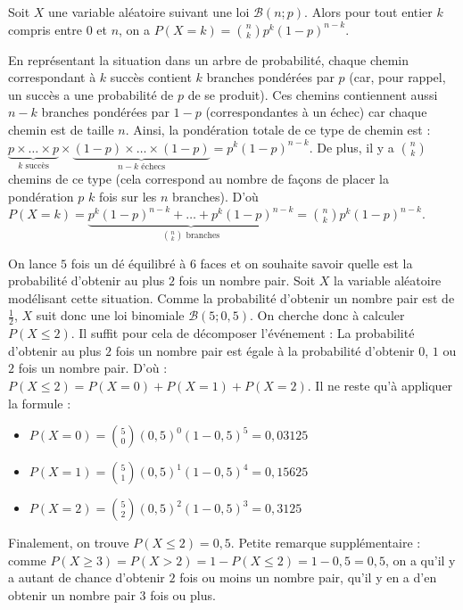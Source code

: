 	\begin{formula}
		Soit $X$ une variable aléatoire suivant une loi $\mathcal{B}(n; p)$. Alors pour tout entier $k$ compris entre $0$ et $n$, on a $P(X = k) = \binom{n}{k} p^k (1-p)^{n-k}$.
	\end{formula}

	\begin{demonstration}
		\contentwidth[big]
		En représentant la situation dans un arbre de probabilité, chaque chemin correspondant à $k$ succès contient $k$ branches pondérées par $p$ (car, pour rappel, un succès a une probabilité de $p$ de se produit). Ces chemins contiennent aussi $n-k$ branches pondérées par $1-p$ (correspondantes à un échec) car chaque chemin est de taille $n$. Ainsi, la pondération totale de ce type de chemin est :
		\newpar
		$\underbrace{p \times \dots \times p}_{k \text{ succès}} \times \underbrace{(1-p) \times \dots \times (1-p)}_{n-k \text{ échecs}} = p^k(1-p)^{n-k}$.
		\newpar
		De plus, il y a $\binom{n}{k}$ chemins de ce type (cela correspond au nombre de façons de placer la pondération $p$ $k$ fois sur les $n$ branches).
		\newpar
		D'où $P(X = k) = \underbrace{p^k(1-p)^{n-k} + \dots + p^k(1-p)^{n-k}}_{\binom{n}{k} \text{ branches}} = \binom{n}{k} p^k(1-p)^{n-k}$.
	\end{demonstration}

	\begin{tip}[Exemple]
		On lance $5$ fois un dé équilibré à $6$ faces et on souhaite savoir quelle est la probabilité d'obtenir au plus $2$ fois un nombre pair.
		\newpar
		Soit $X$ la variable aléatoire modélisant cette situation. Comme la probabilité d'obtenir un nombre pair est de $\frac{1}{2}$, $X$ suit donc une loi binomiale $\mathcal{B}(5; 0,5)$.
		\newpar
		On cherche donc à calculer $P(X \leq 2)$. Il suffit pour cela de décomposer l'événement :
		\newpar
		La probabilité d'obtenir au plus $2$ fois un nombre pair est égale à la probabilité d'obtenir $0$, $1$ ou $2$ fois un nombre pair. D'où :
		\newpar
		$P(X \leq 2) = P(X = 0) + P(X = 1) + P(X = 2)$.
		\newpar
		Il ne reste qu'à appliquer la formule :
		\begin{itemize}
			\item $P(X = 0) = \binom{5}{0}(0,5)^0(1-0,5)^5 = 0,03125$
			\item $P(X = 1) = \binom{5}{1}(0,5)^1(1-0,5)^4 = 0,15625$
			\item $P(X = 2) = \binom{5}{2}(0,5)^2(1-0,5)^3 = 0,3125$
		\end{itemize}
		Finalement, on trouve $P(X \leq 2) = 0,5$.
		\newpar
		Petite remarque supplémentaire : comme $P(X \geq 3) = P(X > 2) = 1 - P(X \leq 2) = 1 - 0,5 = 0,5$, on a qu'il y a autant de chance d'obtenir $2$ fois ou moins un nombre pair, qu'il y en a d'en obtenir un nombre pair $3$ fois ou plus.
	\end{tip}

